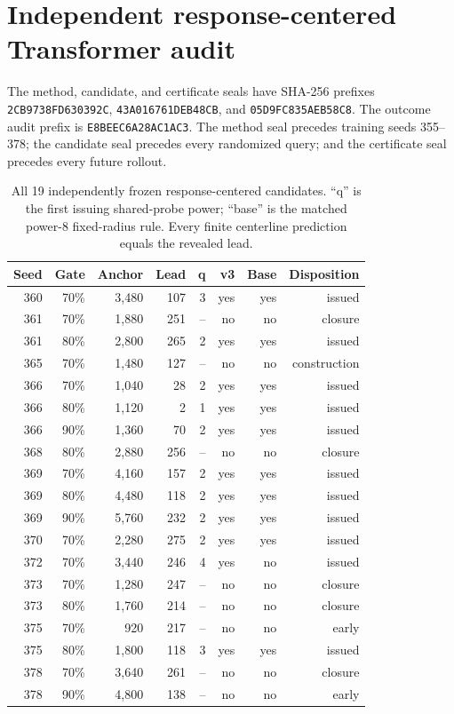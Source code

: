 \documentclass{article}
\begin{document}
\section{Independent response-centered Transformer audit}
\label{app:v3-audit}

The method, candidate, and certificate seals have SHA-256 prefixes
\texttt{2CB9738FD630392C}, \texttt{43A016761DEB48CB}, and
\texttt{05D9FC835AEB58C8}.  The outcome audit prefix is
\texttt{E8BEEC6A28AC1AC3}.  The method seal precedes training seeds 355--378;
the candidate seal precedes every randomized query; and the certificate seal
precedes every future rollout.

\begin{table}[H]
\caption{All 19 independently frozen response-centered candidates.  ``q'' is
the first issuing shared-probe power; ``base'' is the matched power-8
fixed-radius rule.  Every finite centerline prediction equals the revealed
lead.}
\label{tab:v3-all}
\centering
\footnotesize
\setlength{\tabcolsep}{3.6pt}
\begin{tabular}{rrrrrrrr}
\toprule
Seed & Gate & Anchor & Lead & q & v3 & Base & Disposition \\
\midrule
360&70\%&3,480&107&3&yes&yes&issued\\
361&70\%&1,880&251&--&no&no&closure\\
361&80\%&2,800&265&2&yes&yes&issued\\
365&70\%&1,480&127&--&no&no&construction\\
366&70\%&1,040&28&2&yes&yes&issued\\
366&80\%&1,120&2&1&yes&yes&issued\\
366&90\%&1,360&70&2&yes&yes&issued\\
368&80\%&2,880&256&--&no&no&closure\\
369&70\%&4,160&157&2&yes&yes&issued\\
369&80\%&4,480&118&2&yes&yes&issued\\
369&90\%&5,760&232&2&yes&yes&issued\\
370&70\%&2,280&275&2&yes&yes&issued\\
372&70\%&3,440&246&4&yes&no&issued\\
373&70\%&1,280&247&--&no&no&closure\\
373&80\%&1,760&214&--&no&no&closure\\
375&70\%&920&217&--&no&no&early\\
375&80\%&1,800&118&3&yes&yes&issued\\
378&70\%&3,640&261&--&no&no&closure\\
378&90\%&4,800&138&--&no&no&early\\
\bottomrule
\end{tabular}
\end{table}
\end{document}
